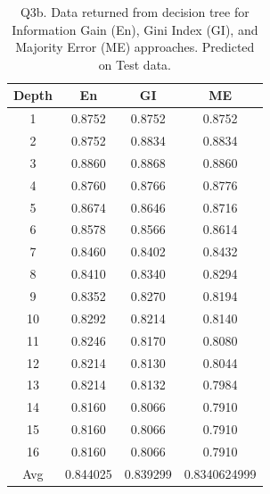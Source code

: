 \documentclass[12pt, fullpage,letterpaper]{article}
\begin{document}
    \begin{table}[h]
    	\centering
    	\begin{tabular}{c|ccc}
    		Depth & En & GI & ME \\ 
    		\hline\hline
    		1 &  0.8752 & 0.8752 & 0.8752 \\ \hline
    		2 &  0.8752 & 0.8834 & 0.8834 \\ \hline
    		3 &  0.8860 & 0.8868 & 0.8860 \\ \hline
    		4 &  0.8760 & 0.8766 & 0.8776 \\ \hline
            5 &  0.8674 & 0.8646 & 0.8716 \\ \hline
            6 &  0.8578 & 0.8566 & 0.8614 \\ \hline
            7 &  0.8460 & 0.8402 & 0.8432 \\ \hline
            8 &  0.8410 & 0.8340 & 0.8294 \\ \hline
            9 &  0.8352 & 0.8270 & 0.8194 \\ \hline
            10 & 0.8292 & 0.8214 & 0.8140 \\ \hline
            11 & 0.8246 & 0.8170 & 0.8080 \\ \hline
            12 & 0.8214 & 0.8130 & 0.8044 \\ \hline
            13 & 0.8214 & 0.8132 & 0.7984 \\ \hline
            14 & 0.8160 & 0.8066 & 0.7910 \\ \hline
            15 & 0.8160 & 0.8066 & 0.7910 \\ \hline
            16 & 0.8160 & 0.8066 & 0.7910 \\ \hline
            \hline
            Avg & 0.844025 & 0.839299 & 0.8340624999

    	\end{tabular}
    	\caption{Q3b. Data returned from decision tree for Information Gain (En), Gini Index (GI), and Majority Error (ME) approaches. Predicted on Test data.}
    \end{table}
\end{document}
